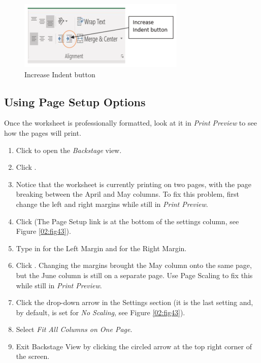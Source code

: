 \begin{figure}[H]
	\centering
	\includegraphics[width=\maxwidth{.95\linewidth}]{gfx/ch02_fig42}
	\caption{Increase Indent button}
	\label{02:fig42}
\end{figure}

\subsection{Using Page Setup Options}

Once the worksheet is professionally formatted, look at it in \textit{Print Preview} to see how the pages will print.

\begin{enumerate}
	\item Click  to open the \textit{Backstage} view. 
	\item Click .
	\item Notice that the worksheet is currently printing on two pages, with the page breaking between the April and May columns. To fix this problem, first change the left and right margins while still in \textit{Print Preview}.
	\item Click  (The Page Setup link is at the bottom of the settings column, see Figure \ref{02:fig43}).
	\item Type in  for the Left Margin and  for the Right Margin.
	\item Click . Changing the margins brought the May column onto the same page, but the June column is still on a separate page. Use Page Scaling to fix this while still in \textit{Print Preview}.
	\item Click the  drop-down arrow in the Settings section (it is the last setting and, by default, is set for \textit{No Scaling}, see Figure \ref{02:fig43}).
	\item Select \textit{Fit All Columns on One Page}.
	\item Exit Backstage View by clicking the circled arrow at the top right corner of the screen.
\end{enumerate}

